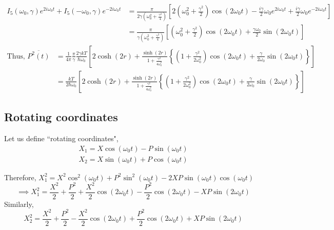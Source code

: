 \documentclass[12pt, twoside]{article}
\begin{document}
$\begin{aligned}
I_5(\omega_0,\gamma)e^{2i\omega_0 t}+I_5(-\omega_0,\gamma)e^{-2i\omega_0 t} &= \frac { \pi } { 2\gamma \left( \omega _ { 0 } ^ { 2 } + \frac { \gamma ^ { 2 } } { 4 } \right) } \left[2 \left( \omega _ { 0 } ^ { 2 } + \frac { \gamma ^ { 2 } } { 2 } \right) \cos \left( 2 \omega _ { 0 } t \right) - \frac { i\gamma } { 2 } \omega _ { 0 } e ^ { 2 i \omega _ { 0 } t } + \frac { i\gamma } { 2 } \omega _ { 0 } e ^ {-2 i \omega _ { 0 } t }\right] 
\\&= \frac { \pi } { \gamma \left( \omega _ { 0 } ^ { 2 } + \frac { \gamma ^ { 2 } } { 4 } \right) } \left[ \left( \omega _ { 0 } ^ { 2 } + \frac { \gamma ^ { 2 } } { 2 } \right) \cos \left( 2 \omega _ { 0 } t \right)  + \frac { \gamma \omega _ { 0 } } { 2 } \sin \left( 2 \omega _ { 0 } t \right) \right] 
\end{aligned}$
\begin{equation}\begin{aligned}\label{eq:p_average} \text{Thus, }
\overline{P ^ { 2 } ( t )} & = \frac{1}{4\pi} \frac{\pi}{\gamma} \frac{2\gamma k T}{\hbar \omega_0} \left[2\cosh(2r) + \frac{\sinh(2r)}{1 + \frac{\gamma^2}{4\omega_0 ^2}}\left\{(1+\frac{\gamma^2}{2\omega_0 ^2})\cos(2\omega_0 t) + \frac{\gamma}{2 \omega_0}\sin(2\omega_0 t)\right\}\right] \\& = \frac{kT}{2 \hbar \omega_0} \left[2\cosh(2r) + \frac{\sinh(2r)}{1 + \frac{\gamma^2}{4\omega_0 ^2}}\left\{(1+\frac{\gamma^2}{2\omega_0 ^2})\cos(2\omega_0 t) + \frac{\gamma}{2 \omega_0}\sin(2\omega_0 t)\right\}\right]
\end{aligned}\end{equation}
\subsection{Rotating coordinates}
Let us define ``rotating coordinates", \begin{equation}\begin{array} { l } { X _ { 1 } = X \cos \left( \omega _ { 0 } t \right) - P \sin ( \omega_0  t ) } \\ { X _ { 2 } = X \sin ( \omega_0  t ) + P \cos ( \omega_0  t ) } \end{array}\end{equation}

 Therefore, $X _ { 1 } ^ { 2 } =  X ^ { 2 } \cos ^ { 2 } \left( \omega _ { 0 } t \right) + P ^ { 2 } \sin ^ { 2 } ( \omega_0  t )  - 2 X P \sin ( \omega_0 t ) \cos \left( \omega _ { 0 } t \right) $
 \begin{equation}\label{eq:rot_1}
 \implies  X _ { 1 } ^ { 2 } = \frac { X ^ { 2 } } { 2 } + \frac { P ^ { 2 } } { 2 } + \frac { X ^ { 2 } } { 2 } \cos \left( 2 \omega _ { 0 } t \right) - \frac { P ^ { 2 } } { 2 } \cos \left( 2 \omega _ { 0 } t \right) - X P \sin(2\omega_0 t)
 \end{equation}
 Similarly,\begin{equation}\label{eq:rot_2}
 X _ { 2 } ^ { 2 } = \frac { X ^ { 2 } } { 2 } + \frac { P ^ { 2 } } { 2 } - \frac { X ^ { 2 } } { 2 } \cos \left( 2 \omega _ { 0 } t \right) + \frac { P ^ { 2 } } { 2 } \cos \left( 2 \omega _ { 0 } t \right) + X P \sin(2\omega_0 t)
 \end{equation}
 
\end{document}
